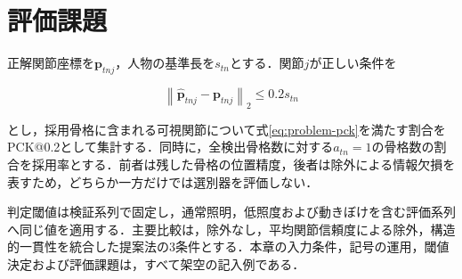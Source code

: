 \section{評価課題}

正解関節座標を$\bm{p}_{tnj}$，人物の基準長を$s_{tn}$とする．関節$j$が正しい条件を

\begin{equation}
  \left\lVert
    \hat{\bm{p}}_{tnj}-\bm{p}_{tnj}
  \right\rVert_{2}
  \leq 0.2s_{tn}
  \label{eq:problem-pck}
\end{equation}

とし，採用骨格に含まれる可視関節について式\eqref{eq:problem-pck}を満たす割合をPCK@0.2として集計する．同時に，全検出骨格数に対する$a_{tn}=1$の骨格数の割合を採用率とする．前者は残した骨格の位置精度，後者は除外による情報欠損を表すため，どちらか一方だけでは選別器を評価しない．

判定閾値は検証系列で固定し，通常照明，低照度および動きぼけを含む評価系列へ同じ値を適用する．主要比較は，除外なし，平均関節信頼度による除外，構造的一貫性を統合した提案法の3条件とする．本章の入力条件，記号の運用，閾値決定および評価課題は，すべて架空の記入例である．
